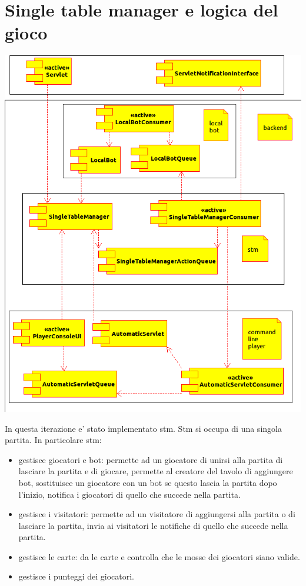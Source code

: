 \section{Single table manager e logica del gioco}
  \begin{center}
    \includegraphics{backend_composit_structure.png}  
  \end{center}
  In questa iterazione e' stato implementato stm. Stm si occupa di una singola partita. In particolare stm:
  \begin{itemize}
    \item 
      gestisce giocatori e bot: permette ad un giocatore di unirsi alla partita  di lasciare la partita e di giocare, permette al creatore del tavolo di aggiungere bot, sostituisce un giocatore con un bot se questo lascia la partita dopo l'inizio, notifica i giocatori di quello che succede nella partita.
    \item
      gestisce i visitatori: permette ad un visitatore di aggiungersi alla partita o di lasciare la partita, invia ai visitatori le notifiche di quello che succede nella partita.
    \item
      gestisce le carte: da le carte e controlla che le mosse dei giocatori siano valide.
    \item
      gestisce i punteggi dei giocatori.
  \end{itemize}
  

